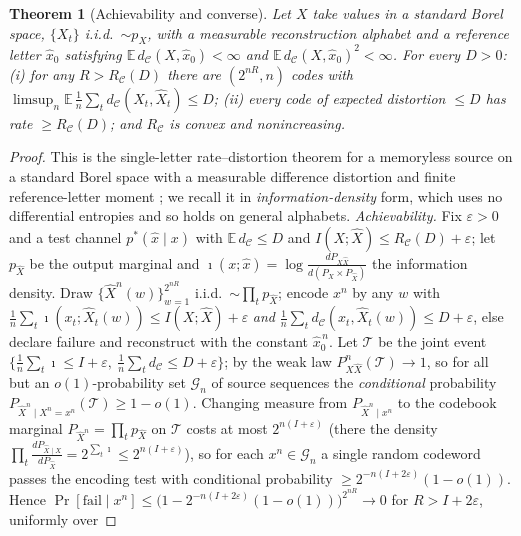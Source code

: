 \documentclass[lettersize,onecolumn]{IEEEtran}
\newtheorem{theorem}{Theorem}
\theoremstyle{definition}
\theoremstyle{remark}
\newcommand{\E}{\mathbb{E}}
\begin{document}
\begin{theorem}[Achievability and converse]\label{thm:coding}
Let $X$ take values in a standard Borel space, $\{X_t\}$ i.i.d.\ $\sim p_X$, with a
measurable reconstruction alphabet and a reference letter $\hat x_0$ satisfying
$\E\,d_{\mathcal{C}}(X,\hat x_0)<\infty$ and $\E\,d_{\mathcal{C}}(X,\hat x_0)^2<\infty$.
For every $D>0$: \emph{(i)} for any $R>R_{\mathcal{C}}(D)$ there are $(2^{nR},n)$ codes
with $\limsup_n\E\,\tfrac1n\sum_t d_{\mathcal{C}}(X_t,\hat X_t)\le D$; \emph{(ii)}
every code of expected distortion $\le D$ has rate $\ge R_{\mathcal{C}}(D)$; and
$R_{\mathcal{C}}$ is convex and nonincreasing.
\end{theorem}
\begin{proof}
This is the single-letter rate--distortion theorem for a memoryless source on a
standard Borel space with a measurable difference distortion and finite
reference-letter moment \cite{berger1971}; we recall it in \emph{information-density}
form, which uses no differential entropies and so holds on general alphabets.
\emph{Achievability.} Fix $\varepsilon>0$ and a test channel $p^{*}(\hat x\mid x)$
with $\E\,d_{\mathcal{C}}\le D$ and $I(X;\hat X)\le R_{\mathcal{C}}(D)+\varepsilon$;
let $p_{\hat X}$ be the output marginal and $\imath(x;\hat x)=\log\frac{dP_{X\hat X}}%
{d(P_X\!\times\!P_{\hat X})}$ the information density. Draw
$\{\hat X^n(w)\}_{w=1}^{2^{nR}}$ i.i.d.\ $\sim\prod_t p_{\hat X}$; encode $x^n$ by any
$w$ with $\tfrac1n\sum_t\imath(x_t;\hat X_t(w))\le I(X;\hat X)+\varepsilon$
\emph{and} $\tfrac1n\sum_t d_{\mathcal{C}}(x_t,\hat X_t(w))\le D+\varepsilon$, else
declare failure and reconstruct with the constant $\hat x_0^{\,n}$. Let $\mathcal{T}$
be the joint event $\{\tfrac1n\sum_t\imath\le I+\varepsilon,\ \tfrac1n\sum_t
d_{\mathcal{C}}\le D+\varepsilon\}$; by the weak law $P_{X\hat X}^{n}(\mathcal{T})\to1$,
so for all but an $o(1)$-probability set $\mathcal{G}_n$ of source sequences the
\emph{conditional} probability $P_{\hat X^n\mid X^n=x^n}(\mathcal{T})\ge1-o(1)$.
Changing measure from $P_{\hat X^n\mid x^n}$ to the codebook marginal
$P_{\hat X^n}=\prod_t p_{\hat X}$ on $\mathcal{T}$ costs at most $2^{n(I+\varepsilon)}$
(there the density $\prod_t\frac{dP_{\hat X\mid X}}{dP_{\hat X}}=2^{\sum_t\imath}\le
2^{n(I+\varepsilon)}$), so for each $x^n\in\mathcal{G}_n$ a single random codeword
passes the encoding test with conditional probability $\ge2^{-n(I+2\varepsilon)}
(1-o(1))$. Hence $\Pr[\mathrm{fail}\mid x^n]\le\big(1-2^{-n(I+2\varepsilon)}
(1-o(1))\big)^{2^{nR}}\to0$ for $R>I+2\varepsilon$, uniformly over

\end{proof}
\end{document}
